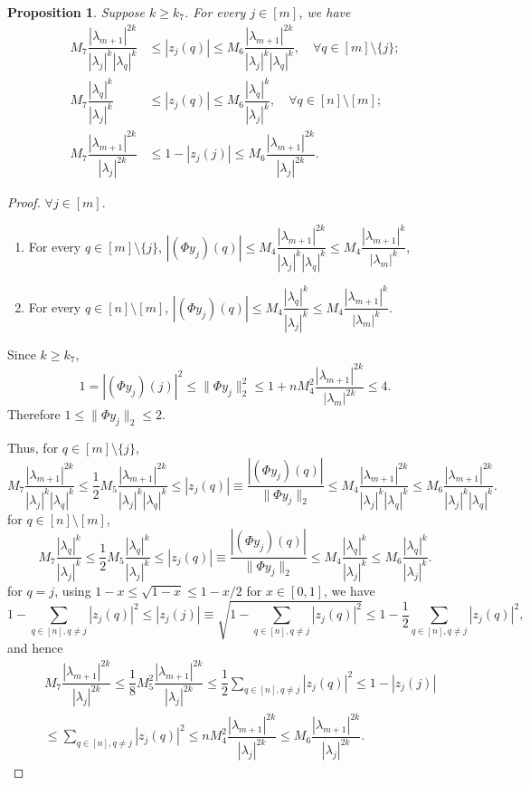 \documentclass[10pt,a4paper]{amsart}
\newtheorem{proposition}[theorem]{Proposition}
\begin{document}
\begin{proposition}
Suppose \(k\geq k_7\). For every \(j\in[m]\), we have
\begin{align*}
M_7\dfrac{|\lambda_{m+1}|^{2k}}{|\lambda_j|^k|\lambda_q|^k}&\leq|z_j(q)|\leq M_6\dfrac{|\lambda_{m+1}|^{2k}}{|\lambda_j|^k|\lambda_q|^k},\quad\forall q\in[m]\setminus\{j\};\\
M_7\dfrac{|\lambda_q|^k}{|\lambda_j|^k}&\leq|z_j(q)|\leq M_6\dfrac{|\lambda_q|^k}{|\lambda_j|^k},\quad\forall q\in[n]\setminus[m];\\
M_7\dfrac{|\lambda_{m+1}|^{2k}}{|\lambda_j|^{2k}}&\leq1-|z_j(j)|\leq M_6\dfrac{|\lambda_{m+1}|^{2k}}{|\lambda_j|^{2k}}.
\end{align*}
\end{proposition}

\begin{proof}
\(\forall j\in[m]\).
\begin{enumerate}
\item For every \(q\in[m]\setminus\{j\}\), \(|(\Phi y_j)(q)|\leq M_4\dfrac{|\lambda_{m+1}|^{2k}}{|\lambda_j|^k|\lambda_q|^k}\leq M_4\dfrac{|\lambda_{m+1}|^k}{|\lambda_m|^k}\),
\item For every \(q\in[n]\setminus[m]\), \(|(\Phi y_j)(q)|\leq M_4\dfrac{|\lambda_q|^k}{|\lambda_j|^k}\leq M_4\dfrac{|\lambda_{m+1}|^k}{|\lambda_m|^k}\).
\end{enumerate}

Since \(k\geq k_7\),
\[
1=|(\Phi y_j)(j)|^2\leq\|\Phi y_j\|_2^2\leq 1+nM_4^2\dfrac{|\lambda_{m+1}|^{2k}}{|\lambda_m|^{2k}}\leq 4.
\]
Therefore \(1\leq\|\Phi y_j\|_2\leq 2\).

Thus, for \(q\in[m]\setminus\{j\}\),
\[
M_7\dfrac{|\lambda_{m+1}|^{2k}}{|\lambda_j|^k|\lambda_q|^k}\leq\dfrac{1}{2}M_5\dfrac{|\lambda_{m+1}|^{2k}}{|\lambda_j|^k|\lambda_q|^k}\leq|z_j(q)|\equiv\dfrac{|(\Phi y_j)(q)|}{\|\Phi y_j\|_2}\leq M_4\dfrac{|\lambda_{m+1}|^{2k}}{|\lambda_j|^k|\lambda_q|^k}\leq M_6\dfrac{|\lambda_{m+1}|^{2k}}{|\lambda_j|^k|\lambda_q|^k}.
\]
for \(q\in[n]\setminus[m]\),
\[
M_7\dfrac{|\lambda_q|^k}{|\lambda_j|^k}\leq\dfrac{1}{2}M_5\dfrac{|\lambda_q|^k}{|\lambda_j|^k}\leq|z_j(q)|\equiv\dfrac{|(\Phi y_j)(q)|}{\|\Phi y_j\|_2}\leq M_4\dfrac{|\lambda_q|^k}{|\lambda_j|^k}\leq M_6\dfrac{|\lambda_q|^k}{|\lambda_j|^k}.
\]
for \(q=j\), using \(1-x\leq\sqrt{1-x}\leq1-x/2\) for \(x\in[0,1]\), we have
\[
1-\sum_{q\in[n],q\neq j}|z_j(q)|^2\leq|z_j(j)|\equiv\sqrt{1-\sum_{q\in[n],q\neq j}|z_j(q)|^2}\leq 1-\dfrac{1}{2}\sum_{q\in[n],q\neq j}|z_j(q)|^2,
\]
and hence
\begin{align*}
&M_7\dfrac{|\lambda_{m+1}|^{2k}}{|\lambda_j|^{2k}}\leq\dfrac{1}{8}M_5^2\dfrac{|\lambda_{m+1}|^{2k}}{|\lambda_j|^{2k}}\leq\dfrac{1}{2}\sum_{q\in[n],q\neq j}|z_j(q)|^2\leq1-|z_j(j)|\\
&\leq\sum_{q\in[n],q\neq j}|z_j(q)|^2\leq nM_4^2\dfrac{|\lambda_{m+1}|^{2k}}{|\lambda_j|^{2k}}\leq M_6\dfrac{|\lambda_{m+1}|^{2k}}{|\lambda_j|^{2k}}.
\end{align*}
\end{proof}
\end{document}
